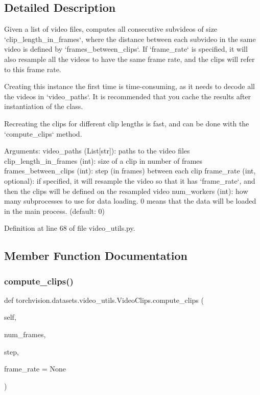 \subsection{Detailed Description}
\begin{DoxyVerb}Given a list of video files, computes all consecutive subvideos of size
`clip_length_in_frames`, where the distance between each subvideo in the
same video is defined by `frames_between_clips`.
If `frame_rate` is specified, it will also resample all the videos to have
the same frame rate, and the clips will refer to this frame rate.

Creating this instance the first time is time-consuming, as it needs to
decode all the videos in `video_paths`. It is recommended that you
cache the results after instantiation of the class.

Recreating the clips for different clip lengths is fast, and can be done
with the `compute_clips` method.

Arguments:
    video_paths (List[str]): paths to the video files
    clip_length_in_frames (int): size of a clip in number of frames
    frames_between_clips (int): step (in frames) between each clip
    frame_rate (int, optional): if specified, it will resample the video
        so that it has `frame_rate`, and then the clips will be defined
        on the resampled video
    num_workers (int): how many subprocesses to use for data loading.
        0 means that the data will be loaded in the main process. (default: 0)
\end{DoxyVerb}
 

Definition at line 68 of file video\+\_\+utils.\+py.



\subsection{Member Function Documentation}
\mbox{\label{classtorchvision_1_1datasets_1_1video__utils_1_1VideoClips_adf7704fec2eae8c21307af5ef65b56b4}} 
\subsubsection{\texorpdfstring{compute\+\_\+clips()}{compute\_clips()}}
{\footnotesize\ttfamily def torchvision.\+datasets.\+video\+\_\+utils.\+Video\+Clips.\+compute\+\_\+clips (\begin{DoxyParamCaption}\item[{}]{self,  }\item[{}]{num\+\_\+frames,  }\item[{}]{step,  }\item[{}]{frame\+\_\+rate = {\ttfamily None} }\end{DoxyParamCaption})}

